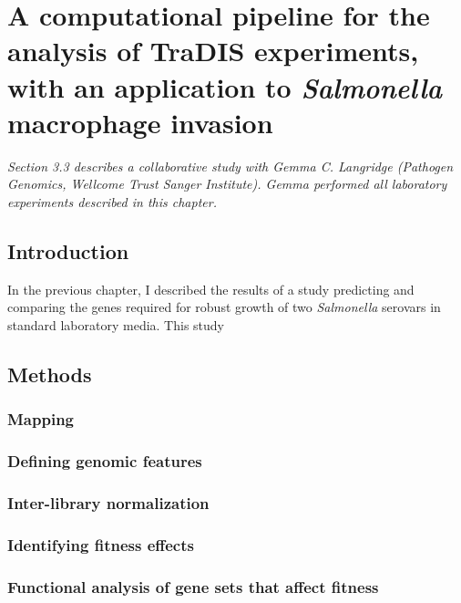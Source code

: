 
\chapter{A computational pipeline for the analysis of TraDIS experiments, with an application to {\it Salmonella} macrophage invasion}
\label{sec:chapterPingpong}
\ifpdf
    \graphicspath{{Chapter3/Chapter3Figs/EPS/}{Chapter3/Chapter3Figs/}}
\fi

\textit{Section 3.3 describes a collaborative study with Gemma C. Langridge (Pathogen Genomics, Wellcome Trust Sanger Institute). Gemma performed all laboratory experiments described in this chapter.}

\section{Introduction}

In the previous chapter, I described the results of a study predicting and comparing the genes required for robust growth of two \textit{Salmonella} serovars in standard laboratory media. This study 

\section{Methods}

\subsection{Mapping}

\subsection{Defining genomic features}

\subsection{Inter-library normalization}

\subsection{Identifying fitness effects}

\subsection{Functional analysis of gene sets that affect fitness}

